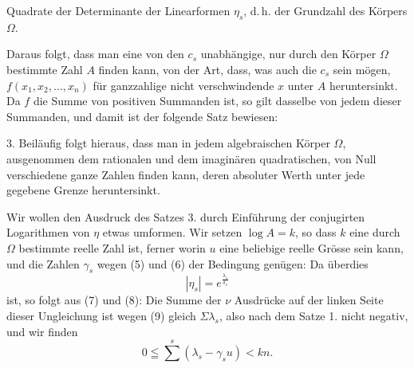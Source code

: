 Quadrate der Determinante der Linearformen $\eta_s$, d.\,h. der Grundzahl des K\"orpers $\Omega$.

Daraus folgt, dass man eine von den $c_s$ unabh\"angige, nur durch den K\"orper $\Omega$ bestimmte Zahl $A$ finden kann, von der Art, dass, was auch die $c_s$ sein m\"ogen, $f(x_1,x_2,\dots,x_n)$ f\"ur ganzzahlige nicht verschwindende $x$ unter $A$ heruntersinkt. Da $f$ die Summe von positiven Summanden ist, so gilt dasselbe von jedem dieser Summanden, und damit ist der folgende Satz bewiesen:

3. 
Beil\"aufig folgt hieraus, dass man in jedem algebraischen K\"orper $\Omega$, ausgenommen dem rationalen und dem imagin\"aren quadratischen, von Null verschiedene ganze Zahlen finden kann, deren absoluter Werth unter jede gegebene Grenze heruntersinkt.

Wir wollen den Ausdruck des Satzes 3. durch Einf\"uhrung der conjugirten Logarithmen von $\eta$ etwas umformen. Wir setzen $\log A = k$, so dass $k$ eine durch $\Omega$ bestimmte reelle Zahl ist, ferner
worin $u$ eine beliebige reelle Gr\"osse sein kann, und die Zahlen $\gamma_s$ wegen (5) und (6) der Bedingung gen\"ugen:
Da \"uberdies
\[
|\eta_s| = e^{\frac{\lambda_s}{\delta_s}}
\]
ist, so folgt aus (7) und (8):
Die Summe der $\nu$ Ausdr\"ucke auf der linken Seite dieser Ungleichung ist wegen (9) gleich $\Sigma\lambda_s$, also nach dem Satze 1. nicht negativ, und wir finden
\[
0 \leqq \sum^{s} (\lambda_s - \gamma_s u) < k n.
\]
